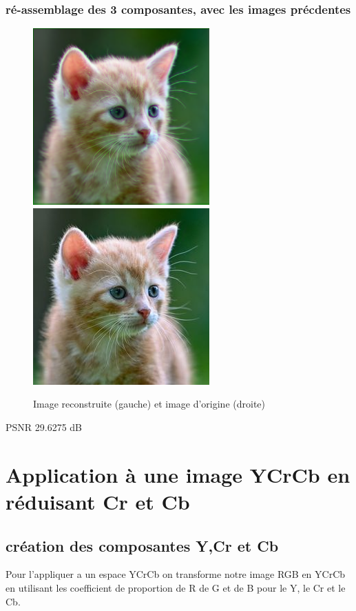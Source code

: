 \documentclass{article}
\begin{document}
\subsubsection*{ré-assemblage des 3 composantes, avec les images précdentes}
\begin{figure}[h]
\centerline{\includegraphics[scale=0.9]{./rendus/ChalexRBReduit.png} \includegraphics[scale=0.9]{./rendus/Chalex.png} }
\caption{Image reconstruite (gauche) et image d'origine (droite) }
\end{figure}

PSNR 29.6275 dB

\section{Application à une image YCrCb en réduisant Cr et Cb}



\subsection{création des composantes Y,Cr et Cb}

Pour l'appliquer a un espace YCrCb on transforme notre image RGB en YCrCb en utilisant les coefficient de proportion de R de G et de B pour le Y, le Cr et le Cb.
\end{document}
